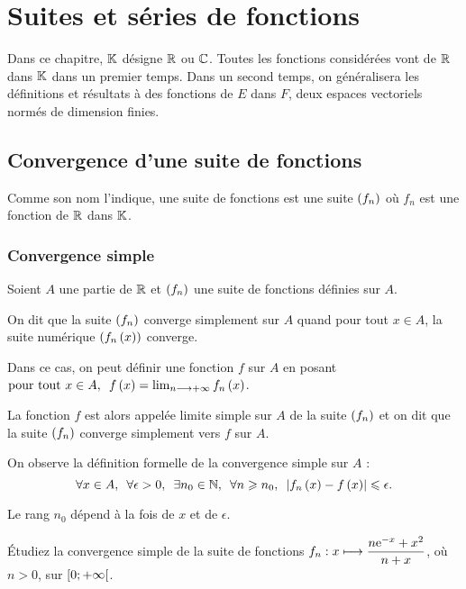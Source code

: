 \chapter{Suites et séries de fonctions}

\minitoc

Dans ce chapitre, \(\mathbb{K}\) désigne \(\mathbb{R}\) ou \(\mathbb{C}\). Toutes les fonctions considérées vont de \(\mathbb{R}\) dans \(\mathbb{K}\) dans un premier temps. Dans un second temps, on généralisera les définitions et résultats à des fonctions de \(E\) dans \(F\), deux espaces vectoriels normés de dimension finies.

\section{Convergence d'une suite de fonctions}

Comme son nom l'indique, une suite de fonctions est une suite \(\left(f_n\right)\) où \(f_n\) est une fonction de \(\mathbb{R}\) dans \(\mathbb{K}\).

\subsection{Convergence simple}

\begin{defi}
Soient \(A\) une partie de \(\mathbb{R}\) et \(\left(f_n\right)\) une suite de fonctions définies sur \(A\).

On dit que la suite \(\left(f_n\right)\) converge simplement sur \(A\) quand pour tout \(x\in A\), la suite numérique \(\left(f_n\left(x\right)\right)\) converge.

Dans ce cas, on peut définir une fonction \(f\) sur \(A\) en posant \(\quantifs{\tpt x\in A}f\paren{x}=\lim_{n\to\pinf}f_n\paren{x}\).

La fonction \(f\) est alors appelée limite simple sur \(A\) de la suite \(\left(f_n\right)\) et on dit que la suite \(\left(f_n\right)\) converge simplement vers \(f\) sur \(A\).
\end{defi}

On observe la définition formelle de la convergence simple sur \(A\) : \[\quantifs{\forall x\in A;\forall\epsilon>0;\exists n_0\in\N;\forall n\geq n_0}\abs{f_n\paren{x}-f\paren{x}}\leq\epsilon.\]

Le rang \(n_0\) dépend à la fois de \(x\) et de \(\epsilon\).

\begin{exo}
Étudiez la convergence simple de la suite de fonctions \(f_n:x\longmapsto\dfrac{n\mathrm{e}^{-x}+x^2}{n+x}\), où \(n>0\), sur \(\left[0;+\infty\right[\).
\end{exo}

